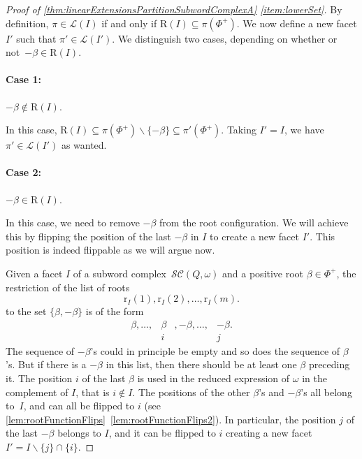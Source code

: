 \documentclass[reqno]{amsart}
\theoremstyle{definition}
\newcommand{\ssm}{\smallsetminus} %
\newcommand{\linearExtensions}{\mathcal{L}} %
\newcommand{\subwordComplex}{\mathcal{SC}} %
\newcommand{\Roots}{\mathrm{R}} %
\newcommand{\rootFunction}[2]{\mathrm{r}_{#1}(#2)} %
\begin{document}
\begin{proof}[Proof of \cref{thm:linearExtensionsPartitionSubwordComplexA} \eqref{item:lowerSet}]
By definition, $\pi \in \linearExtensions(I)$ if and only if $\Roots(I) \subseteq \pi(\Phi^+)$.
We now define a new facet $I'$ such that $\pi' \in \linearExtensions(I')$.
We distinguish two cases, depending on whether or not~$-\beta \in \Roots(I)$.

\medskip
\paragraph{\bf Case 1:} $-\beta \notin \Roots(I)$.

In this case, 
$\Roots(I)\subseteq \pi(\Phi^+) \ssm \{-\beta\} \subseteq \pi'(\Phi^+)$.
Taking $I'=I$, we have 
$\pi'\in \linearExtensions(I')$ 
as wanted.

\medskip
\paragraph{\bf Case 2:} $-\beta \in \Roots(I)$.

In this case, we need to remove $-\beta$ from the root configuration.
We will achieve this by flipping the position of the last $-\beta$ in $I$ to create a new facet $I'$.
This position is indeed flippable as we will argue now. 

Given a facet $I$ of a subword complex~$\subwordComplex(Q,\omega)$ and a positive root $\beta\in \Phi^+$, the restriction of the list of roots 
\[
\rootFunction{I}{1}, \rootFunction{I}{2}, \dots , \rootFunction{I}{m}.
\]
to the set $\{\beta,-\beta\}$ is of the form
\[
\begin{array}{cccc}
\beta, \dots , & \beta &, -\beta, \dots, &-\beta.\\
& i && j
\end{array}
\]
The sequence of $-\beta$'s could in principle be empty and so does the sequence of $\beta$'s.
But if there is a $-\beta$ in this list, then there should be at least one $\beta$ preceding it.
The position $i$ of the last $\beta$ is used in the reduced expression of $\omega$ in the complement of $I$, that is $i\notin I$.
The positions of the other $\beta$'s and $-\beta$'s all belong to~$I$, and can all be flipped to $i$ (see \cref{lem:rootFunctionFlips}~\eqref{lem:rootFunctionFlips2}).   
In particular, the position $j$ of the last $-\beta$ belongs to $I$, and it can be flipped to $i$ creating a new facet $I'=I\ssm \{j\} \cap \{i\}$.


\end{proof}
\end{document}
